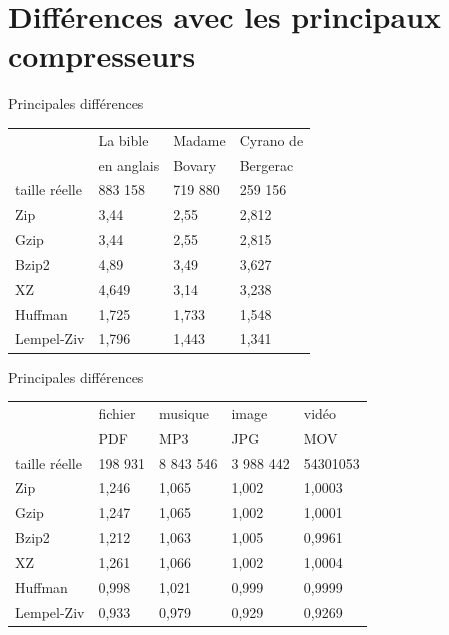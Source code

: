 \documentclass[french]{beamer}
\begin{document}
\section{Différences avec les principaux compresseurs}
\begin{frame}{Principales différences}
	\begin{flushleft}
\begin{tabular}{|l|l|l|l|}
\hline
 & La bible & Madame   & Cyrano de  \\
 & en anglais & Bovary & Bergerac\\ 
\hline
taille réelle & 883 158 & 719 880 & 259 156  \\\hline
Zip & 3,44 & 2,55 & 2,812  \\
\hline
Gzip & 3,44 & 2,55 & 2,815 \\
\hline
Bzip2 & 4,89 & 3,49 & 3,627 \\
\hline
XZ & 4,649 & 3,14 & 3,238 \\
\hline
Huffman & 1,725 & 1,733 & 1,548  \\
\hline
Lempel-Ziv & 1,796 & 1,443 & 1,341 \\
\hline

\end{tabular}
\end{flushleft}
\end{frame}

\begin{frame}{Principales différences}
	\begin{flushleft}
\begin{tabular}{|l|l|l|l|l|}
\hline
 & fichier & musique & image & vidéo\\
 &  PDF & MP3 & JPG & MOV \\ 
\hline
taille réelle &  198 931 & 8 843 546 & 3 988 442 & 54301053 \\\hline
Zip  & 1,246 & 1,065 & 1,002 & 1,0003 \\
\hline
Gzip & 1,247 & 1,065 & 1,002 & 1,0001 \\
\hline
Bzip2 & 1,212 & 1,063 & 1,005 & 0,9961\\
\hline
XZ & 1,261 & 1,066 & 1,002 & 1,0004\\
\hline
Huffman & 0,998 & 1,021 & 0,999 & 0,9999 \\
\hline
Lempel-Ziv & 0,933 & 0,979 & 0,929 & 0,9269\\
\hline

\end{tabular}
\end{flushleft}
\end{frame}
\end{document}

